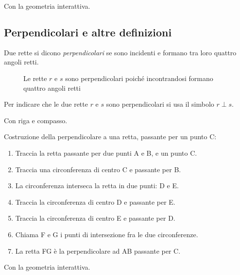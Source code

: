 Con la geometria interattiva.



\subsection{Perpendicolari e altre definizioni}

\begin{definizione}
Due rette si dicono \emph{perpendicolari} se sono incidenti e formano 
tra loro quattro angoli retti.
\end{definizione}


\begin{inaccessibleblock}
 \begin{figure}[htb]
\centering
\caption{Le rette $r$ e $s$ sono perpendicolari poiché incontrandosi 
formano quattro angoli retti}
\end{figure}
\end{inaccessibleblock}

Per indicare che le due rette $r$ e $s$ sono perpendicolari si usa il 
simbolo $r\perp s$.

Con riga e compasso.

\begin{procedura}[Perpendicolare]\label{proc:fonda_perpendicolare}
  Costruzione della perpendicolare a una retta, passante per un punto C:
  \begin{enumerate} [nosep]
    \item 
    Traccia la retta passante per due punti A e B, e un punto C.
    \item 
    Traccia una circonferenza di centro C e passante per B. 
    \item 
    La circonferenza interseca la retta in due punti: D e E.
    \item 
    Traccia la circonferenza di centro D e passante per E.
    \item 
    Traccia la circonferenza di centro E e passante per D.
    \item 
    Chiama F e G i punti di intersezione fra le due circonferenze.
    \item 
    La retta FG è la perpendicolare ad AB passante per C.
  \end{enumerate}
\end{procedura}

Con la geometria interattiva.



